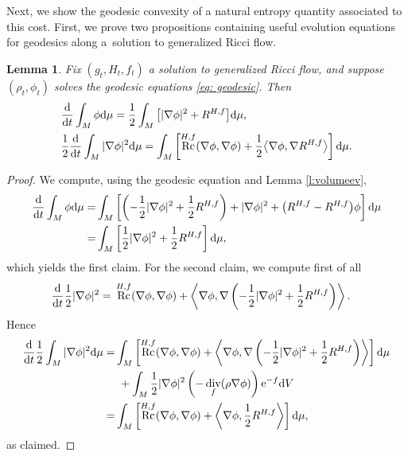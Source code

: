 \documentclass[pdftex]{sigma}
\numberwithin{equation}{section}
\newtheorem{Lemma}[thm]{Lemma}
\newcommand{\N}{\nabla}
\newcommand{\IP}[1]{\left<#1\right>}
\DeclareMathOperator{\Rc}{Rc}
\DeclareMathOperator{\divg}{div}
\begin{document}
Next, we show the geodesic convexity of a natural entropy quantity associated to this cost. First, we prove two propositions containing useful evolution equations for geodesics along a~solution to generalized Ricci flow.

\begin{Lemma}\label{lem: evolution entropy 1} Fix $(g_t, H_t, f_t)$ a solution to generalized Ricci flow, and suppose $(\rho_t,\phi_t)$ solves the geodesic equations \eqref{eq: geodesic}. Then
	\begin{align*}
	&\frac{{\rm d}}{{\rm d}t}\int_M\phi {\rm d}\mu=\frac12\int_M\big[|\N \phi|^2+R^{H,f}\big] {\rm d}\mu,\\
&	\frac12	\frac{{\rm d}}{{\rm d}t}\int_M|\N\phi|^2 {\rm d}\mu=\int_M \left[\Rc^{H,f}(\N\phi,\N\phi) + \frac12\big\langle \N\phi,\N R^{H,f}\big\rangle\right] {\rm d}\mu.
	\end{align*}
\end{Lemma}

\begin{proof}
	We compute, using the geodesic equation and Lemma \ref{l:volumeev},
	\begin{align*}
	\frac{{\rm d}}{{\rm d}t}\int_M\phi {\rm d}\mu =&\int_M\left[\left(-\frac12|\N\phi|^2+\frac12 R^{H,f}\right)+|\N\phi|^2+\big(R^{H,f}-R^{H,f}\big)\phi\right] {\rm d}\mu\\
	=&\int_M\left[\frac12|\N\phi|^2+\frac12 R^{H,f}\right] {\rm d}\mu,
	\end{align*}
	which yields the first claim. For the second claim, we compute first of all
	\begin{align*}
	\frac{{\rm d}}{{\rm d}t}\frac12|\N\phi|^2={}&\Rc^{H,f}(\N\phi,\N\phi) +\IP{\N\phi,\N\left( -\frac12|\N\phi|^2+\frac12R^{H,f} \right)}.
	\end{align*}
	Hence
	\begin{align*}
	\frac{{\rm d}}{{\rm d}t}\frac12\int_M |\N\phi|^2 {\rm d}\mu=&\int_M \left[\Rc^{H,f}(\N\phi,\N\phi) +\IP{\N\phi,\N\left( -\frac12|\N\phi|^2+\frac12R^{H,f} \right)}\right] {\rm d}\mu\\
	&\ +\int_M \frac12|\N\phi|^2 \left(-\divg_f(\rho\N\phi) \right) {\rm e}^{-f} {\rm d}V\\
	=&\int_M \left[\Rc^{H,f}(\N\phi,\N\phi) +\IP{\N\phi,\frac12R^{H,f}}\right] {\rm d}\mu,
	\end{align*}
 as claimed.
\end{proof}
\end{document}
